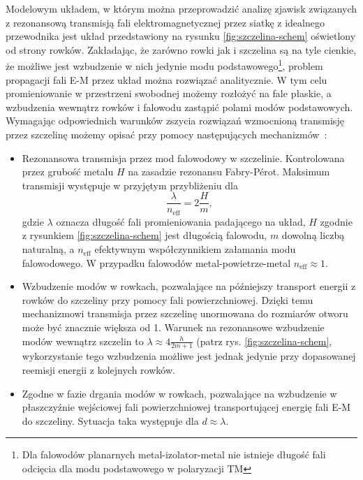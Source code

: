 Modelowym układem, w którym można przeprowadzić analizę zjawisk związanych z rezonansową transmisją fali elektromagnetycznej przez siatkę z idealnego przewodnika jest układ przedstawiony na rysunku \ref{fig:szczelina-schem} oświetlony od strony rowków. Zakładając, że zarówno rowki jak i szczelina są na tyle cienkie, że możliwe jest wzbudzenie w nich jedynie modu podstawowego\footnote{Dla falowodów planarnych metal-izolator-metal nie istnieje długość fali odcięcia dla modu podstawowego w polaryzacji TM}, problem propagacji fali E-M przez układ można rozwiązać analitycznie. W tym celu promieniowanie w przestrzeni swobodnej możemy rozłożyć na fale płaskie, a wzbudzenia wewnątrz rowków i falowodu zastąpić polami modów podstawowych. Wymagając odpowiednich warunków zszycia rozwiązań wzmocnioną transmisję przez szczelinę możemy opisać przy pomocy następujących mechanizmów~\cite{martin2001theory}:
\begin{itemize}
	\item Rezonansowa transmisja przez mod falowodowy w szczelinie. Kontrolowana przez grubość metalu $H$ na zasadzie rezonansu Fabry-P\'{e}rot. Maksimum transmisji występuje w przyjętym przybliżeniu dla
\begin{equation}
\frac{\lambda}{n_{\textrm{eff}}} = 2 \frac {H}{m},
\label{eq:fp-szczelina}
\end{equation}
gdzie $\lambda$ oznacza długość fali promieniowania padającego na układ, $H$ zgodnie z rysunkiem \ref{fig:szczelina-schem} jest długością falowodu, $m$ dowolną liczbą naturalną, a $n_{\textrm{eff}}$ efektywnym współczynnikiem załamania modu falowodowego. W przypadku falowodów metal-powietrze-metal $n_{\textrm{eff}} \approx 1$.
	\item Wzbudzenie modów w rowkach, pozwalające na późniejszy transport energii z rowków do szczeliny przy pomocy fali powierzchniowej. Dzięki temu mechanizmowi transmisja przez szczelinę unormowana do rozmiarów otworu może być znacznie większa od 1. Warunek na rezonansowe wzbudzenie modów wewnątrz szczelin to $\lambda \approx 4 \frac {h}{2m+1}$ (patrz rys. \ref{fig:szczelina-schem}, wykorzystanie tego wzbudzenia możliwe jest jednak jedynie przy dopasowanej reemisji energii z kolejnych rowków.
	\item Zgodne w fazie drgania modów w rowkach, pozwalające na wzbudzenie w płaszczyźnie wejściowej fali powierzchniowej transportującej energię fali E-M do szczeliny. Sytuacja taka występuje dla $d \approx \lambda$.
\end{itemize}



